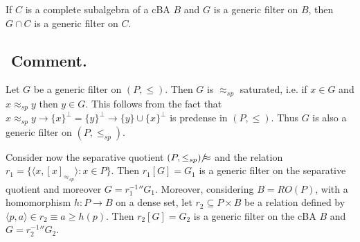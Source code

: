%
%
%

\begin{corollary}
 If $C$ is a complete subalgebra of a cBA $B$ and $G$ is a generic filter on $B$,
then $G \cap C$ is a generic filter on $C$.
\end{corollary}

\subsection{${}$ \hspace{-1em} Comment.}\label{generic_images}
Let $G$ be a generic filter on $(P,\leq)$. Then $G$ is
	$\approx_{sp}$ saturated, i.e. if $x \in G$ and $x \approx_{sp} y$
	then $y \in G$. This follows from the fact that
	$x\approx_{sp} y\rightarrow\{x\}^\perp=\{y\}^\perp\rightarrow\{y\}\cup\{x\}^\perp$
	is predense in $(P,\leq)$.
	Thus $G$ is also a generic filter on $(P,\leq_{sp})$.



	Consider now the separative quotient $(P,\leq_{sp})/\hskip-2mm\approx$
	and the relation $r_1 = \{\langle x,[x]_{\approx_{sp}} \rangle : x \in P \}$.
	Then $r_1[G] = G_1$ is a generic filter on the separative quotient
	and moreover $G = r_1^{-1}{}'' G_1$.
	Moreover, considering $B = RO(P)$, with a homomorphism
	$h : P \to B$ on a dense set, let $r_2 \subseteq P \times B$
	be a relation defined by $\langle p,a \rangle \in r_2 \equiv a \geq h(p)$.
	Then $r_2[G] = G_2$ is a generic filter on the cBA $B$ and $G = r_2^{-1}{}'' G_2$.


